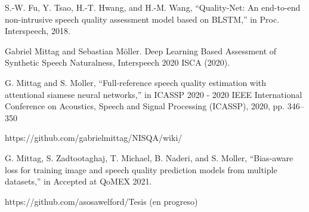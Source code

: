  S.-W. Fu, Y. Tsao, H.-T. Hwang, and H.-M. Wang, “Quality-Net: An end-to-end non-intrusive speech quality assessment model based on BLSTM,” in Proc. Interspeech, 2018.

 Gabriel Mittag and Sebastian Möller. Deep Learning Based Assessment of Synthetic Speech Naturalness, Interspeech 2020 ISCA (2020).
 
 G. Mittag and S. Moller, “Full-reference speech quality estimation with attentional siamese neural networks,” in ICASSP 2020 - 2020 IEEE International Conference on Acoustics, Speech and Signal Processing (ICASSP), 2020, pp. 346–350


 https://github.com/gabrielmittag/NISQA/wiki/

 G. Mittag, S. Zadtootaghaj, T. Michael, B. Naderi, and S. Moller, “Bias-aware loss for training image and speech quality prediction models from multiple datasets,” in Accepted at QoMEX 2021.

 https://github.com/asosawelford/Tesis (en progreso)